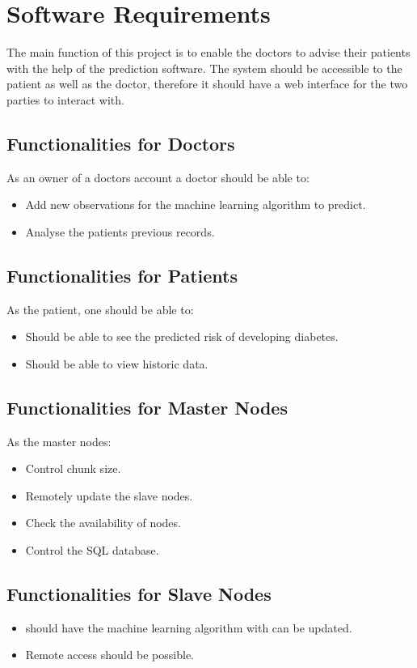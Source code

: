 \documentclass[12pt]{article}
\begin{document}
\newpage
\section{Software Requirements}
The main function of this project is to enable the doctors to advise their patients with the help of the prediction software. The system should be accessible to the patient as well as the doctor, therefore it should have a web interface for the two parties to interact with.

\subsection{Functionalities for Doctors}
As an owner of a doctors account a doctor should be able to:
\begin{itemize}
\item Add new observations for the machine learning algorithm to predict.
\item Analyse the patients previous records.
\end{itemize}

\subsection{Functionalities for Patients}
As the patient, one should be able to:
\begin{itemize}
\item Should be able to see the predicted risk of developing diabetes.
\item Should be able to view historic data.
\end{itemize}

\subsection{Functionalities for Master Nodes}
As the master nodes:
\begin{itemize}
\item Control chunk size.
\item Remotely update the slave nodes.
\item Check the availability of nodes.
\item Control the SQL database.
\end{itemize}

\subsection{Functionalities for Slave Nodes}
\begin{itemize}
\item should have the machine learning algorithm with can be updated.
\item Remote access should be possible.
\end{itemize}
\end{document}
